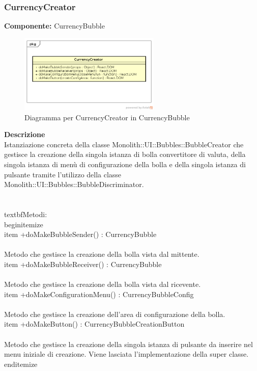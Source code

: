 \subsubsection{CurrencyCreator}
\textbf{Componente:}  CurrencyBubble\\
   \FloatBarrier
   \begin{figure}[ht]
   \centering
   \includegraphics[width=0.6\textwidth]{img/single-CurrencyCreator}
   \caption{{Diagramma per CurrencyCreator in CurrencyBubble}}
\end{figure}
\FloatBarrier
\textbf{Descrizione}\\
Istanziazione concreta della classe Monolith::UI::Bubbles::BubbleCreator che gestisce la creazione della singola istanza di bolla convertitore di valuta, della singola istanza di menù di configurazione della bolla e della singola istanza di pulsante tramite l'utilizzo della classe Monolith::UI::Bubbles::BubbleDiscriminator.
\\\\
\\textbf{Metodi:} 
\\begin{itemize}
\\item +doMakeBubbleSender() : CurrencyBubble 
\\\\
Metodo che gestisce la creazione della bolla vista dal mittente.
\\item +doMakeBubbleReceiver() : CurrencyBubble 
\\\\
Metodo che gestisce la creazione della bolla vista dal ricevente.
\\item +doMakeConfigurationMenu() : CurrencyBubbleConfig 
\\\\
Metodo che gestisce la creazione dell'area di configurazione della bolla.
\\item +doMakeButton() : CurrencyBubbleCreationButton 
\\\\
Metodo che gestisce la creazione della singola istanza di pulsante da inserire nel menu iniziale di creazione. Viene lasciata l'implementazione della super classe.
\\end{itemize} 


